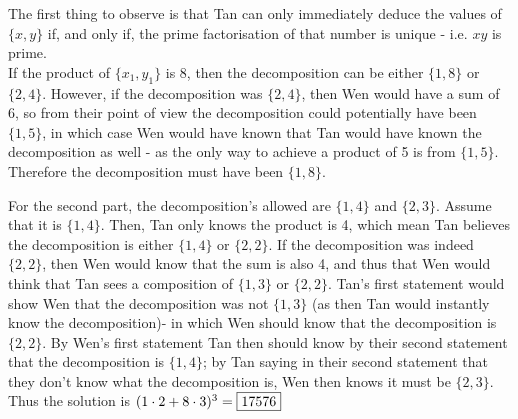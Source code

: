 \documentclass[titlepage=true]{scrartcl}
\begin{document}
    \begin{solution}\hfil\medskip 
     
        The first thing to observe is that Tan can only immediately deduce the values of \(\{x,y\}\) if, and only if, the prime factorisation of that number is unique - i.e. \(xy\) is prime.\\
        If the product of $\{x_1,y_1\}$ is 8, then the decomposition can be either $\{1,8\}$ or $\{2,4\}$. 
        However, if the decomposition was $\{2,4\}$, then Wen would have a sum of 6, so from their point of view the decomposition could potentially have been $\{1,5\}$, in which case Wen would have known that Tan would have known the decomposition as well - as the only way to achieve a product of 5 is from $\{1,5\}$. 
        Therefore the decomposition must have been $\{1,8\}$.
         
         For the second part, the decomposition's allowed are $\{1,4\}$ and $\{2,3\}$. 
         Assume that it is $\{1,4\}$. 
         Then, Tan only knows the product is 4, which mean Tan believes the decomposition is either $\{1,4\}$ or $\{2,2\}$. 
         If the decomposition was indeed $\{2,2\}$, then Wen would know that the sum is also 4, and thus that Wen would think that Tan sees a composition of $\{1,3\}$ or $\{2,2\}$. 
         Tan's first statement would show Wen that the decomposition was not $\{1,3\}$ (as then Tan would instantly know the decomposition)- in which Wen should know that the decomposition is $\{2,2\}$. 
         By Wen's first statement Tan then should know by their second statement that the decomposition is $\{1,4\}$; by Tan saying in their second statement that they don't know what the decomposition is, Wen then knows it must be $\{2,3\}$. 
         Thus the solution is \((1\cdot2+8\cdot3)^3 =\fbox{17576}\)
     \end{solution}
\end{document}
